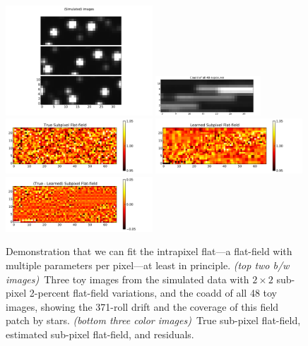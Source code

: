 \documentclass[letterpaper,12pt,whitepaper]{haastex}
\begin{document}
\begin{figure}
\includegraphics[trim=0.75in 0.25in 0.75in 0.25in, width=0.49\textwidth]{sim2-208}%
\includegraphics[trim=0.75in 0.00in 0.75in 0.00in, width=0.35\textwidth]{sim2-200}\\[0.3in]
\includegraphics[trim=0.5in 0.5in 0.5in 0.5in, width=0.49\textwidth]{sim2-201}%
\includegraphics[trim=0.5in 0.5in 0.5in 0.5in, width=0.49\textwidth]{sim2-202}\\[0.4in]
\includegraphics[trim=0.5in 0.5in 0.5in 0.5in, width=0.49\textwidth]{sim2-203}
\caption{Demonstration that we can fit the intrapixel flat---a flat-field with multiple parameters per pixel---at least in principle.
\textsl{(top two b/w images)}~Three toy images from the simulated data with $2\times 2$ sub-pixel 2-percent flat-field variations,
  and the coadd of all 48 toy images, showing the 371-roll drift and the coverage of this field patch by stars.
\textsl{(bottom three color images)}~True sub-pixel flat-field, estimated sub-pixel flat-field, and residuals.
}
\end{figure}
\end{document}
